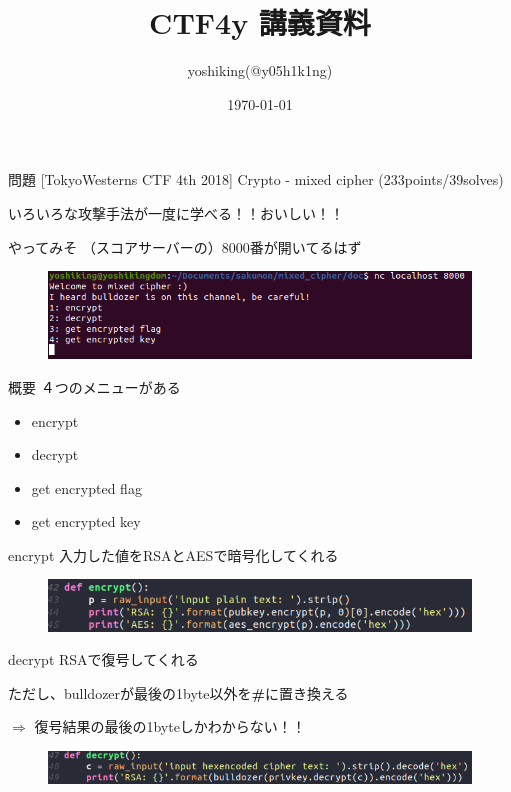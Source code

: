 \documentclass[dvipdfmx]{beamer}
\title{CTF4y 講義資料}
\date{\today}
\author{yoshiking(@y05h1k1ng)}
\begin{document}
\maketitle

\begin{frame}{問題}
  [TokyoWesterns CTF 4th 2018] Crypto - mixed cipher (233points/39solves)

  いろいろな攻撃手法が一度に学べる！！おいしい！！
\end{frame}

\begin{frame}{やってみそ}
  （スコアサーバーの）8000番が開いてるはず
  \begin{figure}
    \includegraphics[width=0.8\linewidth]{./img/nc.png}
  \end{figure}
\end{frame}

\begin{frame}{概要}
  ４つのメニューがある
  \begin{itemize}
  \item encrypt
  \item decrypt
  \item get encrypted flag
  \item get encrypted key
  \end{itemize}
\end{frame}

\begin{frame}{encrypt}
  入力した値をRSAとAESで暗号化してくれる
  \begin{figure}
    \includegraphics[width=0.8\linewidth]{./img/encrypt.png}
  \end{figure}
\end{frame}

\begin{frame}{decrypt}
  RSAで復号してくれる
  
  ただし、bulldozerが最後の1byte以外を{\bf \#}に置き換える

  $\Rightarrow$ 復号結果の最後の1byteしかわからない！！
  \begin{figure}
    \includegraphics[width=0.8\linewidth]{./img/decrypt.png}
  \end{figure}
\end{frame}
\end{document}
